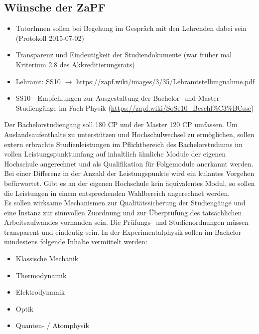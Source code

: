     \subsection{Wünsche der ZaPF}
      \begin{itemize}
        \item TutorInnen sollen bei Begehung im Gespräch mit den Lehrenden dabei sein (Protokoll 2015-07-02)
        \item Transparenz und Eindeutigkeit der Studiendokumente (war früher mal Kriterium 2.8 des Akkreditierungsrats)
        \item Lehramt: SS10 $\rightarrow$ \url{https://zapf.wiki/images/3/35/Lehramtstellungnahme.pdf}
        \item SS10 - Empfehlungen zur Ausgestaltung der Bachelor- und Master-Studiengänge im Fach Physik (\url{https://zapf.wiki/SoSe10_Beschl%C3%BCsse})
      \end{itemize}

        Der Bachelorstudiengang soll 180 CP und der Master 120 CP umfassen.
        Um Auslandsaufenthalte zu unterstützen und Hochschulwechsel zu ermöglichen, sollen extern erbrachte Studienleistungen im Pflichtbereich
        des Bachelorstudiums im vollen Leistungspunktumfang auf inhaltlich ähnliche Module der eigenen Hochschule angerechnet und als Qualifikation
        für Folgemodule anerkannt werden. Bei einer Differenz in der Anzahl der Leistungspunkte wird ein kulantes Vorgehen befürwortet.
        Gibt es an der eigenen Hochschule kein äquivalentes Modul, so sollen die Leistungen in einem entsprechenden Wahlbereich angerechnet werden. \\

        Es sollen wirksame Mechanismen zur Qualitätssicherung der Studiengänge und eine Instanz zur sinnvollen Zuordnung und zur Überprüfung des tatsächlichen Arbeitsaufwandes vorhanden sein.
        Die Prüfungs- und Studienordnungen müssen transparent und eindeutig sein.
        In der Experimentalphysik sollen im Bachelor mindestens folgende Inhalte vermittelt werden:
        \begin{itemize}
          \item Klassische Mechanik
          \item Thermodynamik
          \item Elektrodynamik
          \item Optik
          \item Quanten- / Atomphysik
        \end{itemize}

